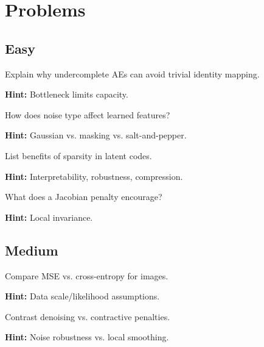 
\section*{Problems}

\subsection*{Easy}

\begin{problem}[Undercomplete AE]
Explain why undercomplete AEs can avoid trivial identity mapping.

\textbf{Hint:} Bottleneck limits capacity.
\end{problem}

\begin{problem}
How does noise type affect learned features?

\textbf{Hint:} Gaussian vs. masking vs. salt-and-pepper.
\end{problem}

\begin{problem}
List benefits of sparsity in latent codes.

\textbf{Hint:} Interpretability, robustness, compression.
\end{problem}

\begin{problem}
What does a Jacobian penalty encourage?

\textbf{Hint:} Local invariance.
\end{problem}

\subsection*{Medium}

\begin{problem}
Compare MSE vs. cross-entropy for images.

\textbf{Hint:} Data scale/likelihood assumptions.
\end{problem}

\begin{problem}
Contrast denoising vs. contractive penalties.

\textbf{Hint:} Noise robustness vs. local smoothing.
\end{problem}

